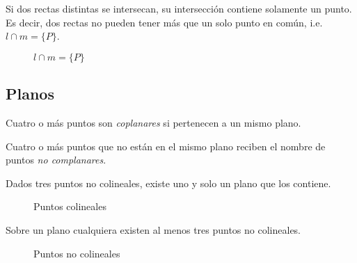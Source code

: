 \clearpage

\begin{theorem}

Si dos rectas distintas se intersecan, su intersección contiene solamente un punto. Es decir, dos rectas no pueden tener más que un solo punto en común, i.e. $l \cap m = \{P\}$.

    \begin{figure}[!h]
        \centering
        
        \caption{$l \cap m = \{P\}$}
        \label{fig:plot19}
    \end{figure}
    
\end{theorem}

\clearpage

\subsection{Planos}

\begin{definition}
Cuatro o más puntos son \textit{coplanares} si pertenecen a un mismo plano.
\end{definition}

\begin{definition}
Cuatro o más puntos que no están en el mismo plano reciben el nombre de puntos \textit{no complanares}.
\end{definition}

\begin{postulate}
    Dados tres puntos no colineales, existe uno y solo un plano que los contiene.
    
    \begin{figure}[!h]
        \centering
        
        \caption{Puntos colineales}
        \label{fig:plot5}
    \end{figure}
\end{postulate}

\begin{postulate}
    Sobre un plano cualquiera existen al menos tres puntos no colineales.
    
    \begin{figure}[!h]
        \centering
        
        \caption{Puntos no colineales}
        \label{fig:plot6}
    \end{figure}
\end{postulate}

